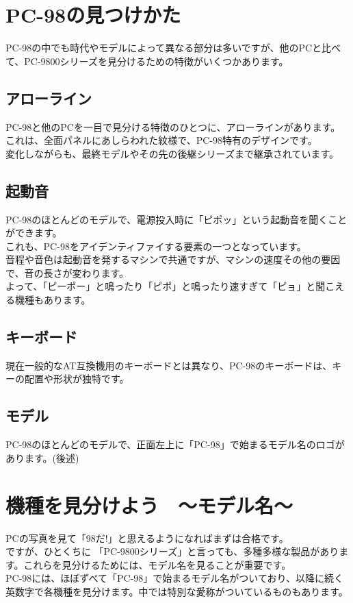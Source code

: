 \documentclass[b5paper,9pt,platex,dvipdfmx]{jsarticle}
\begin{document}
\begin{multicols}{3}
\section[short]{PC-98の見つけかた}
PC-98の中でも時代やモデルによって異なる部分は多いですが、他のPCと比べて、PC-9800シリーズを見分けるための特徴がいくつかあります。\\
\subsection[short]{アローライン}
PC-98と他のPCを一目で見分ける特徴のひとつに、アローラインがあります。\\
これは、全面パネルにあしらわれた紋様で、PC-98特有のデザインです。\\
変化しながらも、最終モデルやその先の後継シリーズまで継承されています。\\
\subsection[short]{起動音}
PC-98のほとんどのモデルで、電源投入時に「ピポッ」という起動音を聞くことができます。\\
これも、PC-98をアイデンティファイする要素の一つとなっています。\\
音程や音色は起動音を発するマシンで共通ですが、マシンの速度その他の要因で、音の長さが変わります。\\
よって、「ピーポー」と鳴ったり「ピポ」と鳴ったり速すぎて「ピョ」と聞こえる機種もあります。\\
\subsection[short]{キーボード}
現在一般的なAT互換機用のキーボードとは異なり、PC-98のキーボードは、キーの配置や形状が独特です。\\
\subsection[short]{モデル}
PC-98のほとんどのモデルで、正面左上に「PC-98」で始まるモデル名のロゴがあります。(後述)\\
\section[short]{機種を見分けよう　〜モデル名〜}
PCの写真を見て「98だ!」と思えるようになればまずは合格です。\\
ですが、ひとくちに 「PC-9800シリーズ」と言っても、多種多様な製品があります。これらを見分けるためには、モデル名を見ることが重要です。\\
PC-98には、ほぼずべて「PC-98」で始まるモデル名がついており、以降に続く英数字で各機種を見分けます。中では特別な愛称がついているものもあります。
\end{multicols}
\end{document}
